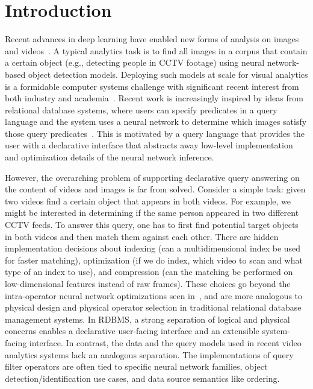 \section{Introduction}\label{intro}\sloppy
Recent advances in deep learning have enabled new forms of analysis on images and videos~\cite{lecun2015deep}. 
A typical analytics task is to find all images in a corpus that contain a certain object (e.g., detecting people in CCTV footage) using neural network-based object detection models.  
Deploying such models at scale for visual analytics is a formidable computer systems challenge with significant recent interest from both industry and academia~\cite{kang2017noscope, anderson2018predicate, kang2018blazeit, chetlur2014cudnn, fengeva, zhang2018ffs, anderson2018physical, jiang2018mainstream, jiang2018chameleon}. 
Recent work is increasingly inspired by ideas from relational database systems, where users can specify predicates in a query language and the system uses a neural network to determine which images satisfy those query predicates~\cite{kang2018blazeit,wu2018querying}.
This is motivated by a query language that provides the user with a declarative interface that abstracts away low-level implementation and optimization details of the neural network inference.

However, the overarching problem of supporting declarative query answering on the content of videos and images is far from solved.
Consider a simple task: given two videos find a certain object that appears in both videos. For example, we might be interested in determining if the same person appeared in two different CCTV feeds. To answer this query, one has to first find potential target objects in both videos and then match them against each other. There are hidden implementation decisions about indexing (can a multidimensional index be used for faster matching), optimization (if we do index, which video to scan and what type of an index to use), and compression (can the matching be performed on low-dimensional features instead of raw frames). These choices go beyond the intra-operator neural network optimizations seen in~\cite{kang2017noscope, zhang2018ffs, anderson2018physical, jiang2018chameleon}, and are more analogous to physical design and physical operator selection in traditional relational database management systems. In RDBMS, a strong separation of logical and physical concerns enables a declarative user-facing interface and an extensible system-facing interface. In contrast, the data and the query models used in recent video analytics systems lack an analogous separation. The implementations of query filter operators are often tied to specific neural network families, object detection/identification use cases, and data source semantics like ordering.

